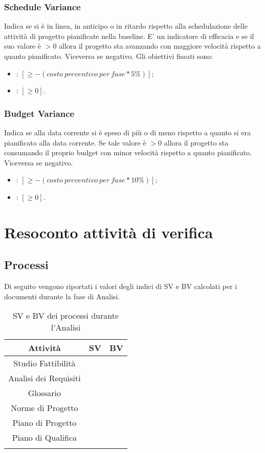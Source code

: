 \subsubsection{Schedule Variance}
\label{4.3.1}
Indica se si è in linea, in anticipo o in ritardo rispetto alla schedulazione delle attività di progetto pianificate nella baseline. E' un indicatore di efficacia e se il suo valore è $> 0$ allora il progetto sta avanzando con maggiore velocità rispetto a quanto pianificato. Viceversa se negativo.
Gli obiettivi fissati sono:
\begin{itemize}
\item {}: $ [\geq -(costo\:preventivo\:per\:fase * 5\%)]; $
\item {}: $ [\geq 0]. $
\end{itemize}

\subsubsection{Budget Variance}
\label{4.3.2}
Indica se alla data corrente si è speso di più o di meno rispetto a quanto si era pianificato alla data corrente. Se tale valore è $>0$ allora il progetto sta consumando il proprio budget con minor velocità rispetto a quanto pianificato. Viceversa se negativo.
\begin{itemize}
\item {}: $[\geq -(costo\:preventivo\:per\:fase * 10\%)];$
\item {}: $[\geq 0].$
\end{itemize}

\newpage
\section{Resoconto attività di verifica}
\label{5.0}

\subsection{Processi}
\label{5.1}
Di seguito vengono riportati i valori degli indici di SV e BV calcolati per i documenti durante la fase di Analisi.

\begin{longtable}{|c|p{3cm}|p{3cm}|}
\toprule
\textbf{Attività} & \textbf{SV} & \textbf{BV} \\


\midrule
Studio Fattibilità & & \\
\midrule
Analisi dei Requisiti & & \\
\midrule
Glossario & & \\
\midrule
Norme di Progetto & & \\
\midrule
Piano di Progetto  & & \\
\midrule
Piano di Qualifica & & \\
\bottomrule
\caption{SV e BV dei processi durante l'Analisi}
\label{tab:changelog}
\end{longtable}

